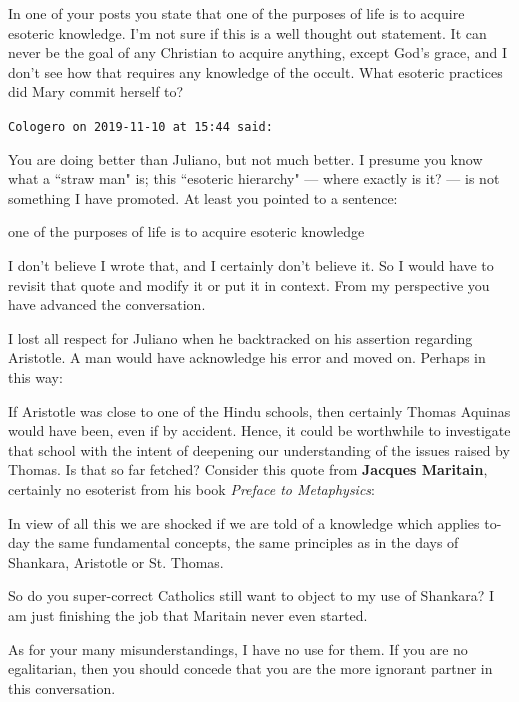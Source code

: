 \begin{footnotesize}
\begin{sffamily}
In one of your posts you state that one of the purposes of life is to acquire esoteric knowledge. I'm not sure if this is a well thought out statement. It can never be the goal of any Christian to acquire anything, except God's grace, and I don't see how that requires any knowledge of the occult. What esoteric practices did Mary commit herself to?


\hfill

\texttt{Cologero on 2019-11-10 at 15:44 said: }

You are doing better than Juliano, but not much better. I presume you know what a ``straw man" is; this ``esoteric hierarchy" — where exactly is it? — is not something I have promoted. At least you pointed to a sentence:

\begin{quotex}
one of the purposes of life is to acquire esoteric knowledge 

\end{quotex}
I don't believe I wrote that, and I certainly don't believe it. So I would have to revisit that quote and modify it or put it in context. From my perspective you have advanced the conversation.

I lost all respect for Juliano when he backtracked on his assertion regarding Aristotle. A man would have acknowledge his error and moved on. Perhaps in this way:

If Aristotle was close to one of the Hindu schools, then certainly Thomas Aquinas would have been, even if by accident. Hence, it could be worthwhile to investigate that school with the intent of deepening our understanding of the issues raised by Thomas. Is that so far fetched? Consider this quote from \textbf{Jacques Maritain}, certainly no esoterist from his book \emph{Preface to Metaphysics}: 

\begin{quotex}
In view of all this we are shocked if we are told of a knowledge which applies to-day the same fundamental concepts, the same principles as in the days of Shankara, Aristotle or St. Thomas. 

\end{quotex}
So do you super-correct Catholics still want to object to my use of Shankara? I am just finishing the job that Maritain never even started.

As for your many misunderstandings, I have no use for them. If you are no egalitarian, then you should concede that you are the more ignorant partner in this conversation.



\end{sffamily}
\end{footnotesize}
